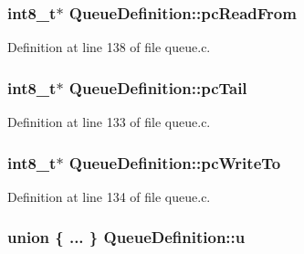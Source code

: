 \subsubsection[{\texorpdfstring{pc\+Read\+From}{pcReadFrom}}]{\setlength{\rightskip}{0pt plus 5cm}int8\+\_\+t$\ast$ Queue\+Definition\+::pc\+Read\+From}\hypertarget{struct_queue_definition_a970cf73ab9c7382b581bc310b1d947d5}{}\label{struct_queue_definition_a970cf73ab9c7382b581bc310b1d947d5}


Definition at line 138 of file queue.\+c.

\subsubsection[{\texorpdfstring{pc\+Tail}{pcTail}}]{\setlength{\rightskip}{0pt plus 5cm}int8\+\_\+t$\ast$ Queue\+Definition\+::pc\+Tail}\hypertarget{struct_queue_definition_a189dc1b16fc2152dd9441ea1a117b0ce}{}\label{struct_queue_definition_a189dc1b16fc2152dd9441ea1a117b0ce}


Definition at line 133 of file queue.\+c.

\subsubsection[{\texorpdfstring{pc\+Write\+To}{pcWriteTo}}]{\setlength{\rightskip}{0pt plus 5cm}int8\+\_\+t$\ast$ Queue\+Definition\+::pc\+Write\+To}\hypertarget{struct_queue_definition_abdf13cc013c8488848cee3fce4f0fed3}{}\label{struct_queue_definition_abdf13cc013c8488848cee3fce4f0fed3}


Definition at line 134 of file queue.\+c.

\subsubsection[{\texorpdfstring{u}{u}}]{\setlength{\rightskip}{0pt plus 5cm}union \{ ... \}   Queue\+Definition\+::u}\hypertarget{struct_queue_definition_a3a2be4f333e88fd5bc1ddb7ae8441e28}{}\label{struct_queue_definition_a3a2be4f333e88fd5bc1ddb7ae8441e28}
